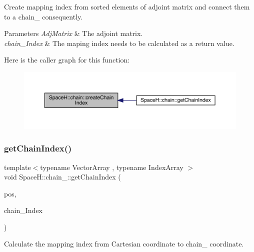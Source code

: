 Create mapping index from sorted elements of adjoint matrix and connect them to a chain_ consequently.
\begin{DoxyParams}{Parameters}
{\em Adj\+Matrix} & The adjoint matrix. \\
\hline
{\em chain_\+Index} & The maping index needs to be calculated as a return value. \\
\hline
\end{DoxyParams}
Here is the caller graph for this function\+:\nopagebreak
\begin{figure}[H]
\begin{center}
\leavevmode
\includegraphics[width=350pt]{namespace_space_h_1_1chain_a65d906373401066033d8e4a6ad581cce_icgraph}
\end{center}
\end{figure}
\mbox{\label{namespace_space_h_1_1chain_a9f1ed51f097bc8cf691a87b97639dde9}} 
\subsubsection{\texorpdfstring{get\+Chain\+Index()}{getChainIndex()}}
{\footnotesize\ttfamily template$<$typename Vector\+Array , typename Index\+Array $>$ \\
void Space\+H\+::chain_\+::get\+Chain\+Index (\begin{DoxyParamCaption}\item[{const Vector\+Array \&}]{pos,  }\item[{Index\+Array \&}]{chain_\+Index }\end{DoxyParamCaption})}



Calculate the mapping index from Cartesian coordinate to chain_ coordinate.


